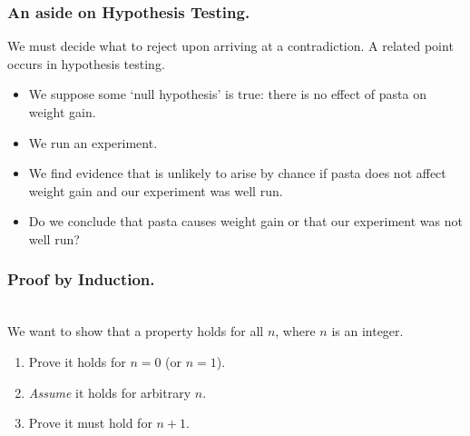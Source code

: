 \documentclass[aspectratio=169, handout]{beamer}
\numberwithin{equation}{section}
\begin{document}
\begin{frame}
\frametitle{An aside on Hypothesis Testing.}
We must decide what to reject upon arriving at a contradiction.   A related point occurs in hypothesis testing.

\begin{itemize}
\item We suppose some `null hypothesis' is true: there is no effect of pasta on weight gain.
\item We run an experiment.\pause
\item We find evidence that is unlikely to arise by chance if pasta does not affect weight gain and our experiment was well run.\pause
\item Do we conclude that pasta causes weight gain or that our experiment was not well run? \pause
\end{itemize}


\end{frame}




\begin{frame}
\frametitle{Proof by Induction.}
\ \\We want to show that a property holds for all $n$, where $n$ is an integer. 
\begin{enumerate}
\item Prove it holds for $n=0$ (or $n=1$).  
\item  \textit{Assume} it holds for arbitrary $n$. 
\item  Prove it must hold for $n+1$.
\end{enumerate}

\end{frame}
\end{document}
